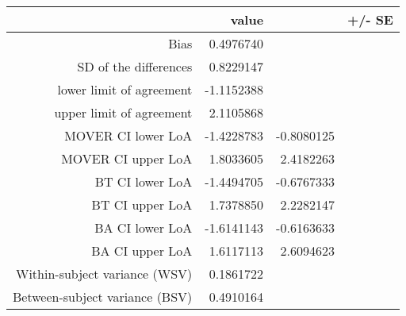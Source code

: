 \begin{table}[ht]
\centering
\begin{tabular}{rrrr}
  \hline
 & value &   & +/- SE \\ 
  \hline
Bias & 0.4976740 &  &  \\ 
  SD of the differences & 0.8229147 &  &  \\ 
  lower limit of agreement & -1.1152388 &  &  \\ 
  upper limit of agreement & 2.1105868 &  &  \\ 
  MOVER CI lower LoA & -1.4228783 & -0.8080125 &  \\ 
  MOVER CI upper LoA & 1.8033605 & 2.4182263 &  \\ 
  BT CI lower LoA & -1.4494705 & -0.6767333 &  \\ 
  BT CI upper LoA & 1.7378850 & 2.2282147 &  \\ 
  BA CI lower LoA & -1.6141143 & -0.6163633 &  \\ 
  BA CI upper LoA & 1.6117113 & 2.6094623 &  \\ 
  Within-subject variance (WSV) & 0.1861722 &  &  \\ 
  Between-subject variance (BSV) & 0.4910164 &  &  \\ 
   \hline
\end{tabular}
\end{table}
